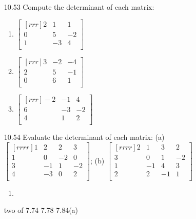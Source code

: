 \documentclass[12pt]{article}
\theoremstyle{definition}
\theoremstyle{plain}
\begin{document}
\begin{enumerate}
\item[10.53]Compute the determinant of each matrix:
	\begin{enumerate}
	\item $\begin{bmatrix}[rrr]2&1&1\\0&5&-2\\1&-3&4\\\end{bmatrix}$
	\item $\begin{bmatrix}[rrr]3&-2&-4\\2&5&-1\\0&6&1\\\end{bmatrix}$
	\item $\begin{bmatrix}[rrr]-2&-1&4\\6&-3&-2\\4&1&2\\\end{bmatrix}$
	\end{enumerate}

\item[10.54]Evaluate the determinant of each matrix: (a) $\begin{bmatrix}[rrrr]1&2&2&3\\1&0&-2&0\\3&-1&1&-2\\4&-3&0&2\\\end{bmatrix}$; (b) $\begin{bmatrix}[rrrr]2&1&3&2\\3&0&1&-2\\1&-1&4&3\\2&2&-1&1\\\end{bmatrix}$
	\begin{enumerate}
	\item
	\end{enumerate}

\item[two of 7.74 7.78 7.84(a)]
\end{enumerate}
\end{document}
